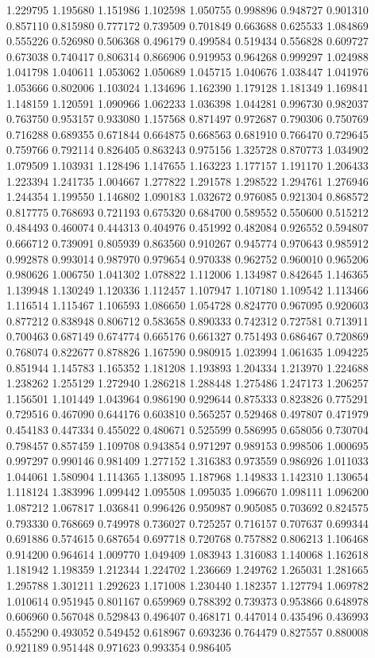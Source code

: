 1.229795
1.195680
1.151986
1.102598
1.050755
0.998896
0.948727
0.901310
0.857110
0.815980
0.777172
0.739509
0.701849
0.663688
0.625533
1.084869
0.555226
0.526980
0.506368
0.496179
0.499584
0.519434
0.556828
0.609727
0.673038
0.740417
0.806314
0.866906
0.919953
0.964268
0.999297
1.024988
1.041798
1.040611
1.053062
1.050689
1.045715
1.040676
1.038447
1.041976
1.053666
0.802006
1.103024
1.134696
1.162390
1.179128
1.181349
1.169841
1.148159
1.120591
1.090966
1.062233
1.036398
1.044281
0.996730
0.982037
0.763750
0.953157
0.933080
1.157568
0.871497
0.972687
0.790306
0.750769
0.716288
0.689355
0.671844
0.664875
0.668563
0.681910
0.766470
0.729645
0.759766
0.792114
0.826405
0.863243
0.975156
1.325728
0.870773
1.034902
1.079509
1.103931
1.128496
1.147655
1.163223
1.177157
1.191170
1.206433
1.223394
1.241735
1.004667
1.277822
1.291578
1.298522
1.294761
1.276946
1.244354
1.199550
1.146802
1.090183
1.032672
0.976085
0.921304
0.868572
0.817775
0.768693
0.721193
0.675320
0.684700
0.589552
0.550600
0.515212
0.484493
0.460074
0.444313
0.404976
0.451992
0.482084
0.926552
0.594807
0.666712
0.739091
0.805939
0.863560
0.910267
0.945774
0.970643
0.985912
0.992878
0.993014
0.987970
0.979654
0.970338
0.962752
0.960010
0.965206
0.980626
1.006750
1.041302
1.078822
1.112006
1.134987
0.842645
1.146365
1.139948
1.130249
1.120336
1.112457
1.107947
1.107180
1.109542
1.113466
1.116514
1.115467
1.106593
1.086650
1.054728
0.824770
0.967095
0.920603
0.877212
0.838948
0.806712
0.583658
0.890333
0.742312
0.727581
0.713911
0.700463
0.687149
0.674774
0.665176
0.661327
0.751493
0.686467
0.720869
0.768074
0.822677
0.878826
1.167590
0.980915
1.023994
1.061635
1.094225
0.851944
1.145783
1.165352
1.181208
1.193893
1.204334
1.213970
1.224688
1.238262
1.255129
1.272940
1.286218
1.288448
1.275486
1.247173
1.206257
1.156501
1.101449
1.043964
0.986190
0.929644
0.875333
0.823826
0.775291
0.729516
0.467090
0.644176
0.603810
0.565257
0.529468
0.497807
0.471979
0.454183
0.447334
0.455022
0.480671
0.525599
0.586995
0.658056
0.730704
0.798457
0.857459
1.109708
0.943854
0.971297
0.989153
0.998506
1.000695
0.997297
0.990146
0.981409
1.277152
1.316383
0.973559
0.986926
1.011033
1.044061
1.580904
1.114365
1.138095
1.187968
1.149833
1.142310
1.130654
1.118124
1.383996
1.099442
1.095508
1.095035
1.096670
1.098111
1.096200
1.087212
1.067817
1.036841
0.996426
0.950987
0.905085
0.703692
0.824575
0.793330
0.768669
0.749978
0.736027
0.725257
0.716157
0.707637
0.699344
0.691886
0.574615
0.687654
0.697718
0.720768
0.757882
0.806213
1.106468
0.914200
0.964614
1.009770
1.049409
1.083943
1.316083
1.140068
1.162618
1.181942
1.198359
1.212344
1.224702
1.236669
1.249762
1.265031
1.281665
1.295788
1.301211
1.292623
1.171008
1.230440
1.182357
1.127794
1.069782
1.010614
0.951945
0.801167
0.659969
0.788392
0.739373
0.953866
0.648978
0.606960
0.567048
0.529843
0.496407
0.468171
0.447014
0.435496
0.436993
0.455290
0.493052
0.549452
0.618967
0.693236
0.764479
0.827557
0.880008
0.921189
0.951448
0.971623
0.993354
0.986405
